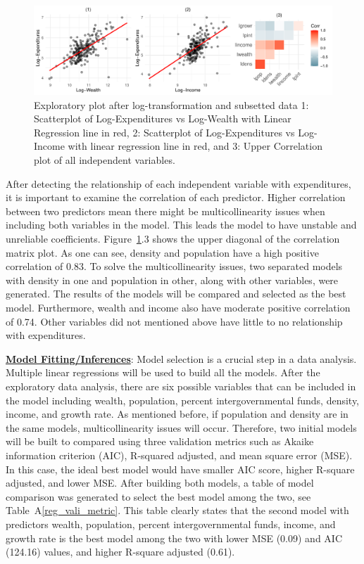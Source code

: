 \documentclass[11pt]{article}\usepackage[]{graphicx}\usepackage[]{color}
\makeatletter
\def\maxwidth{ %
  \ifdim\Gin@nat@width>\linewidth
    \linewidth
  \else
    \Gin@nat@width
  \fi
}
\makeatother
\begin{document}
\begin{figure}[h!] 
\begin{center}

\includegraphics[width=\maxwidth]{figure/unnamed-chunk-3-1} 

\caption{Exploratory plot after log-transformation and subsetted data 1: Scatterplot of Log-Expenditures vs Log-Wealth with Linear Regression line in red, 2: Scatterplot of Log-Expenditures vs Log-Income with linear regression line in red, and 3: Upper Correlation plot of all independent variables.}
\label{sec-explore}
\end{center} 
\end{figure}

\noindent After detecting the relationship of each independent variable with expenditures, it is important to examine the correlation of each predictor. Higher correlation between two predictors mean there might be multicollinearity issues when including both variables in the model. This leads the model to have unstable and unreliable coefficients. Figure~\ref{sec-explore}.3 shows the upper diagonal of the correlation matrix plot. As one can see, density and population have a high positive correlation of 0.83. To solve the multicollinearity issues, two separated models with density in one and population in other, along with other variables, were generated. The results of the models will be compared and selected as the best model. Furthermore, wealth and income also have moderate positive correlation of 0.74. Other variables did not mentioned above have little to no relationship with expenditures.          
\hfill \break



\noindent\textbf{\underline{Model Fitting/Inferences}}: Model selection is a crucial step in a data analysis. Multiple linear regressions will be used to build all the models. After the exploratory data analysis, there are six possible variables that can be included in the model including wealth, population, percent intergovernmental funds, density, income, and growth rate. As mentioned before, if population and density are in the same models, multicollinearity issues will occur. Therefore, two initial models will be built to compared using three validation metrics such as Akaike information criterion (AIC), R-squared adjusted, and mean square error (MSE). In this case, the ideal best model would have smaller AIC score, higher R-square adjusted, and lower MSE. After building both models, a table of model comparison was generated to select the best model among the two, see Table~A\ref{reg_vali_metric}. This table clearly states that the second model with predictors wealth, population, percent intergovernmental funds, income, and growth rate is the best model among the two with lower MSE (0.09) and AIC (124.16) values, and higher R-square adjusted (0.61).
\hfill \break
\end{document}
